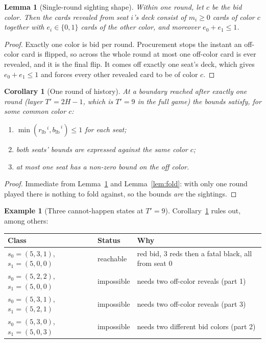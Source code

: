 \documentclass[11pt]{article}
\theoremstyle{plain}
\newtheorem{lemma}[theorem]{Lemma}
\newtheorem{corollary}[theorem]{Corollary}
\theoremstyle{definition}
\newtheorem{example}[theorem]{Example}
\theoremstyle{remark}
\newcommand{\seat}[1]{\ensuremath{s_{#1}}}
\newcommand{\rlb}{\ensuremath{r_{\mathrm{lb}}}}
\newcommand{\blb}{\ensuremath{b_{\mathrm{lb}}}}
\begin{document}
\begin{lemma}[Single-round sighting shape]\label{lem:sighting}
Within one round, let $c$ be the bid color. Then the cards revealed from
seat $i$'s deck consist of $m_i\ge 0$ cards of color $c$ together with
$e_i\in\{0,1\}$ cards of the other color, and moreover
$e_0+e_1\le 1$.
\end{lemma}

\begin{proof}
Exactly one color is bid per round. Procurement stops the instant an
off-color card is flipped, so across the whole round at most one
off-color card is ever revealed, and it is the final flip. It comes off
exactly one seat's deck, which gives $e_0+e_1\le 1$ and forces every other
revealed card to be of color $c$.
\end{proof}

\begin{corollary}[One round of history]\label{cor:onernd}
At a boundary reached after exactly one round (layer $T'=2H-1$, which is
$T'=9$ in the full game) the bounds satisfy, for some common color $c$:
\begin{enumerate}\itemsep1pt
  \item $\min(\rlb^{\,i},\blb^{\,i})\le 1$ for each seat;
  \item both seats' bounds are expressed against the \emph{same} color
        $c$;
  \item at most one seat has a non-zero bound on the off color.
\end{enumerate}
\end{corollary}

\begin{proof}
Immediate from Lemma~\ref{lem:sighting} and Lemma~\ref{lem:fold}: with only
one round played there is nothing to fold against, so the bounds \emph{are}
the sightings.
\end{proof}

\begin{example}[Three cannot-happen states at $T'=9$]
Corollary~\ref{cor:onernd} rules out, among others:
\begin{center}
\begin{tabular}{@{}lll@{}}
\toprule
Class & Status & Why\\
\midrule
$\seat{0}=(5,3,1)$, $\seat{1}=(5,0,0)$ & reachable & red bid, $3$ reds then a fatal black, all from seat $0$\\
$\seat{0}=(5,2,2)$, $\seat{1}=(5,0,0)$ & impossible & needs two off-color reveals (part 1)\\
$\seat{0}=(5,3,1)$, $\seat{1}=(5,2,1)$ & impossible & needs two off-color reveals (part 3)\\
$\seat{0}=(5,3,0)$, $\seat{1}=(5,0,3)$ & impossible & needs two different bid colors (part 2)\\
\bottomrule
\end{tabular}
\end{center}
\end{example}
\end{document}
